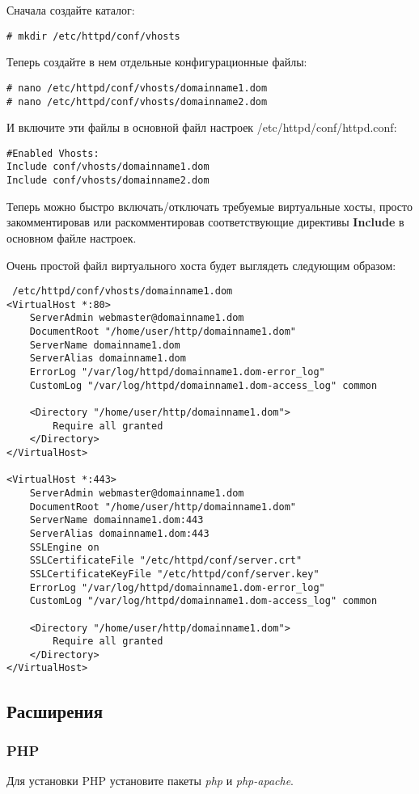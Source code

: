 \documentclass[a4paper,10pt,twoside]{article}
\begin{document}
Сначала создайте каталог:
\begin{verbatim}
# mkdir /etc/httpd/conf/vhosts
\end{verbatim} 
Теперь создайте в нем отдельные конфигурационные файлы:
\begin{verbatim}
# nano /etc/httpd/conf/vhosts/domainname1.dom
# nano /etc/httpd/conf/vhosts/domainname2.dom
\end{verbatim} 

И включите эти файлы в основной файл настроек /etc/httpd/conf/httpd.conf:
\begin{verbatim}
#Enabled Vhosts:
Include conf/vhosts/domainname1.dom
Include conf/vhosts/domainname2.dom
\end{verbatim} 

Теперь можно быстро включать/отключать требуемые виртуальные хосты, просто закомментировав или раскомментировав соответствующие директивы \textbf{Include} в основном файле настроек.

Очень простой файл виртуального хоста будет выглядеть следующим образом:
\begin{verbatim}
 /etc/httpd/conf/vhosts/domainname1.dom
<VirtualHost *:80>
    ServerAdmin webmaster@domainname1.dom
    DocumentRoot "/home/user/http/domainname1.dom"
    ServerName domainname1.dom
    ServerAlias domainname1.dom
    ErrorLog "/var/log/httpd/domainname1.dom-error_log"
    CustomLog "/var/log/httpd/domainname1.dom-access_log" common

    <Directory "/home/user/http/domainname1.dom">
        Require all granted
    </Directory>
</VirtualHost>

<VirtualHost *:443>
    ServerAdmin webmaster@domainname1.dom
    DocumentRoot "/home/user/http/domainname1.dom"
    ServerName domainname1.dom:443
    ServerAlias domainname1.dom:443
    SSLEngine on
    SSLCertificateFile "/etc/httpd/conf/server.crt"
    SSLCertificateKeyFile "/etc/httpd/conf/server.key"
    ErrorLog "/var/log/httpd/domainname1.dom-error_log"
    CustomLog "/var/log/httpd/domainname1.dom-access_log" common

    <Directory "/home/user/http/domainname1.dom">
        Require all granted
    </Directory>
</VirtualHost>
\end{verbatim} 

\subsection{Расширения} 
\subsubsection{PHP}
Для установки PHP установите пакеты \textit{php} и \textit{php-apache}.
\end{document}
